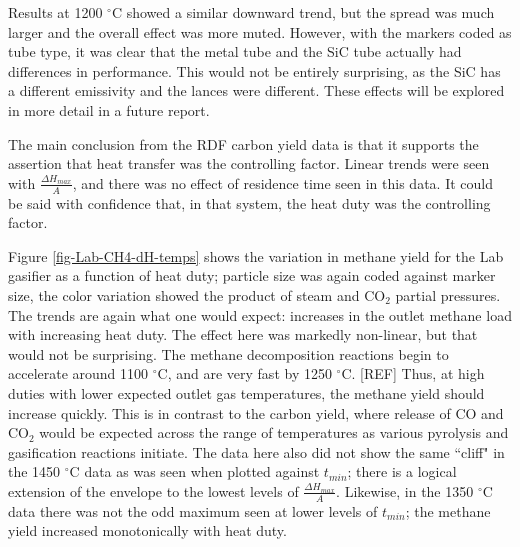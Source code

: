 \documentclass[11pt,twocolumn]{article}
\begin{document}

Results at 1200 $^{\circ}$C showed a similar downward trend, but the spread was much larger and the overall effect was more muted.  However, with the markers coded as tube type, it was clear that the metal tube and the SiC tube actually had differences in performance.  This would not be entirely surprising, as the SiC has a different emissivity and the lances were different.  These effects will be explored in more detail in a future report.

The main conclusion from the RDF carbon yield data is that it supports the assertion that heat transfer was the controlling factor.  Linear trends were seen with $\frac{\Delta H_{max}}{A}$, and there was no effect of residence time seen in this data.  It could be said with confidence that, in that system, the heat duty was the controlling factor.

Figure \ref{fig-Lab-CH4-dH-temps} shows the variation in methane yield for the Lab gasifier as a function of heat duty; particle size was again coded against marker size, the color variation showed the product of steam and CO$_2$ partial pressures.  The trends are again what one would expect: increases in the outlet methane load with increasing heat duty.  The effect here was markedly non-linear, but that would not be surprising.  The methane decomposition reactions begin to accelerate around 1100 $^{\circ}$C, and are very fast by 1250 $^{\circ}$C.  [REF]  Thus, at high duties with lower expected outlet gas temperatures, the methane yield should increase quickly.  This is in contrast to the carbon yield, where release of CO and CO$_2$ would be expected across the range of temperatures as various pyrolysis and gasification reactions initiate.  The data here also did not show the same ``cliff" in the 1450 $^{\circ}$C data as was seen when plotted against $t_{min}$; there is a logical extension of the envelope to the lowest levels of $\frac{\Delta H_{max}}{A}$.  Likewise, in the 1350 $^{\circ}$C data there was not the odd maximum seen at lower levels of $t_{min}$; the methane yield increased monotonically with heat duty.
\end{document}
